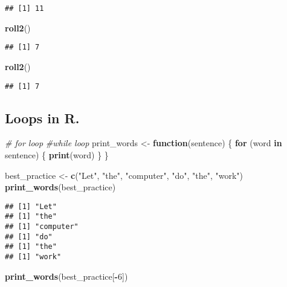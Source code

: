 \documentclass[
]{article}
\newenvironment{Shaded}{\begin{snugshade}}{\end{snugshade}}
\newcommand{\CommentTok}[1]{\textcolor[rgb]{0.56,0.35,0.01}{\textit{#1}}}
\newcommand{\ControlFlowTok}[1]{\textcolor[rgb]{0.13,0.29,0.53}{\textbf{#1}}}
\newcommand{\DecValTok}[1]{\textcolor[rgb]{0.00,0.00,0.81}{#1}}
\newcommand{\FunctionTok}[1]{\textcolor[rgb]{0.13,0.29,0.53}{\textbf{#1}}}
\newcommand{\NormalTok}[1]{#1}
\newcommand{\OtherTok}[1]{\textcolor[rgb]{0.56,0.35,0.01}{#1}}
\newcommand{\SpecialCharTok}[1]{\textcolor[rgb]{0.81,0.36,0.00}{\textbf{#1}}}
\newcommand{\StringTok}[1]{\textcolor[rgb]{0.31,0.60,0.02}{#1}}
\begin{document}
\begin{verbatim}
## [1] 11
\end{verbatim}

\begin{Shaded}
\begin{Highlighting}[]
\FunctionTok{roll2}\NormalTok{()}
\end{Highlighting}
\end{Shaded}

\begin{verbatim}
## [1] 7
\end{verbatim}

\begin{Shaded}
\begin{Highlighting}[]
\FunctionTok{roll2}\NormalTok{()}
\end{Highlighting}
\end{Shaded}

\begin{verbatim}
## [1] 7
\end{verbatim}

\subsection{Loops in R.}\label{loops-in-r.}

\begin{Shaded}
\begin{Highlighting}[]
\CommentTok{\# for loop}
\CommentTok{\#while loop}
\NormalTok{print\_words }\OtherTok{\textless{}{-}} \ControlFlowTok{function}\NormalTok{(sentence) \{}
\ControlFlowTok{for}\NormalTok{ (word }\ControlFlowTok{in}\NormalTok{ sentence) \{}
\FunctionTok{print}\NormalTok{(word)}
\NormalTok{\}}
\NormalTok{\}}

\NormalTok{best\_practice }\OtherTok{\textless{}{-}} \FunctionTok{c}\NormalTok{(}\StringTok{"Let"}\NormalTok{, }\StringTok{"the"}\NormalTok{, }\StringTok{"computer"}\NormalTok{, }\StringTok{"do"}\NormalTok{, }\StringTok{"the"}\NormalTok{, }\StringTok{"work"}\NormalTok{)}
\FunctionTok{print\_words}\NormalTok{(best\_practice)}
\end{Highlighting}
\end{Shaded}

\begin{verbatim}
## [1] "Let"
## [1] "the"
## [1] "computer"
## [1] "do"
## [1] "the"
## [1] "work"
\end{verbatim}

\begin{Shaded}
\begin{Highlighting}[]
\FunctionTok{print\_words}\NormalTok{(best\_practice[}\SpecialCharTok{{-}}\DecValTok{6}\NormalTok{])}
\end{Highlighting}
\end{Shaded}
\end{document}
